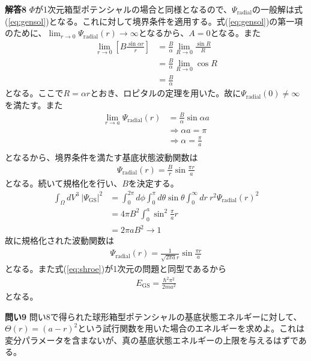 \documentclass[11pt,pra,aps]{revtex4}
\begin{document}
\noindent
{\bf 解答8}
$\Phi$が1次元箱型ポテンシャルの場合と同様となるので、$\Psi_\text{radial}$の一般解は式(\ref{eq:gensol})となる。これに対して境界条件を適用する。式(\ref{eq:gensol})の第一項のために、$\lim_{r\rightarrow0}\Psi_\text{radial}(r)\rightarrow\infty$となるから、$A=0$となる。また
\begin{align}
  \lim_{r\rightarrow0}\left[B\frac{\sin\alpha r}{r}\right]&=\frac{B}{\alpha}\lim_{R\rightarrow0}\frac{\sin R}{R} \nonumber \\
  &=\frac{B}{\alpha}\lim_{R\rightarrow0}\cos R \nonumber \\
  &=\frac{B}{\alpha}
\end{align}
となる。ここで$R=\alpha r$とおき、ロピタルの定理を用いた。故に$\Psi_\text{radial}(0)\neq\infty$を満たす。また
\begin{align}
  \lim_{r\rightarrow a}\Psi_\text{radial}(r)&=\frac{B}{\alpha}\sin\alpha a \\
  &\Rightarrow \alpha a = \pi \\
  &\Rightarrow \alpha = \frac{\pi}{a} \\
\end{align}
となるから、境界条件を満たす基底状態波動関数は
\begin{align}
  \Psi_\text{radial}(r)=\frac{B}{r}\sin\frac{\pi r}{a}
\end{align}
となる。続いて規格化を行い、$B$を決定する。
\begin{align}
  \int_\Omega dV^3 \ |\Psi_\text{GS}|^{2}&=\int^{2\pi}_0d\phi\int^{\pi}_0d\theta\sin\theta\int_0^\infty dr \ r^2 \Psi_\text{radial}(r)^2 \nonumber \\
  &=4\pi B^2 \int^a_0 \sin^2\frac{\pi}{a} r \nonumber \\
  &=2\pi aB^2\rightarrow 1
\end{align}
故に規格化された波動関数は
\begin{align}
  \Psi_\text{radial}(r)=\frac{1}{\sqrt{2\pi a}r}\sin\frac{\pi r}{a}
\end{align}
となる。また式(\ref{eq:shroe})が1次元の問題と同型であるから
\begin{align}
  E_\text{GS}=\frac{\hbar^2\pi^2}{2ma^2}
\end{align}
となる。

\noindent
{\bf 問い9} 問い8で得られた球形箱型ポテンシャルの基底状態エネルギーに対して、$\Theta(r)=(a-r)^2$という試行関数を用いた場合のエネルギーを求めよ。これは変分パラメータを含まないが、真の基底状態エネルギーの上限を与えるはずである。
\end{document}
